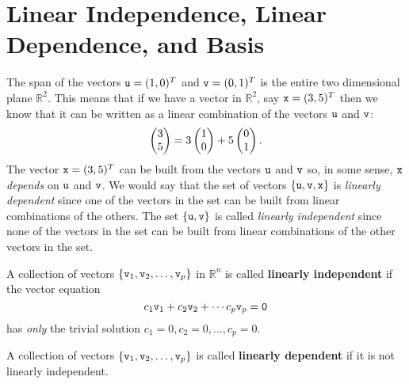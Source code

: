 \newpage\section{Linear Independence, Linear Dependence, and Basis}
The span of the vectors $\texttt{u} = (1,0)^T$ and $\texttt{v} = (0,1)^T$ is the entire two dimensional
plane $\mathbb{R}^2$.  This means that if we have a vector in $\mathbb{R}^2$, say $\texttt{x} =
(3,5)^T$ then we know that it can be written as a linear combination of the vectors $\texttt{u}$
and $\texttt{v}$:
\[ \begin{pmatrix} 3\\5\end{pmatrix} = 3 \begin{pmatrix} 1\\0\end{pmatrix} + 5 \begin{pmatrix} 0\\1\end{pmatrix}. \]
The vector $\texttt{x} = (3,5)^T$ can be built from the vectors $\texttt{u}$ and $\texttt{v}$ so, in some
sense, $\texttt{x}$ {\it depends} on $\texttt{u}$ and $\texttt{v}$.  We would say that the set of vectors
$\{\texttt{u},\texttt{v},\texttt{x}\}$ is {\it linearly dependent} since one of the vectors in the set can be
built from linear combinations of the others.  The set $\{\texttt{u},\texttt{v}\}$ is called {\it
linearly independent} since none of the vectors in the set can be built from linear
combinations of the other vectors in the set.
\begin{definition}
    A collection of vectors $\{\texttt{v}_1, \texttt{v}_2, \dots, \texttt{v}_p\}$ in $\mathbb{R}^n$ is called {\bf linearly
    independent} if the vector equation
    \[ c_1 \texttt{v}_1 + c_2 \texttt{v}_2 + \cdots c_p \texttt{v}_p = \texttt{0} \]
    has {\it only} the trivial solution $c_1=0, c_2=0, \dots, c_p=0$.
\end{definition}

\begin{definition}
    A collection of vectors $\{\texttt{v}_1, \texttt{v}_2, \dots, \texttt{v}_p\}$ is called {\bf linearly
    dependent} if it is not linearly independent.
\end{definition}


